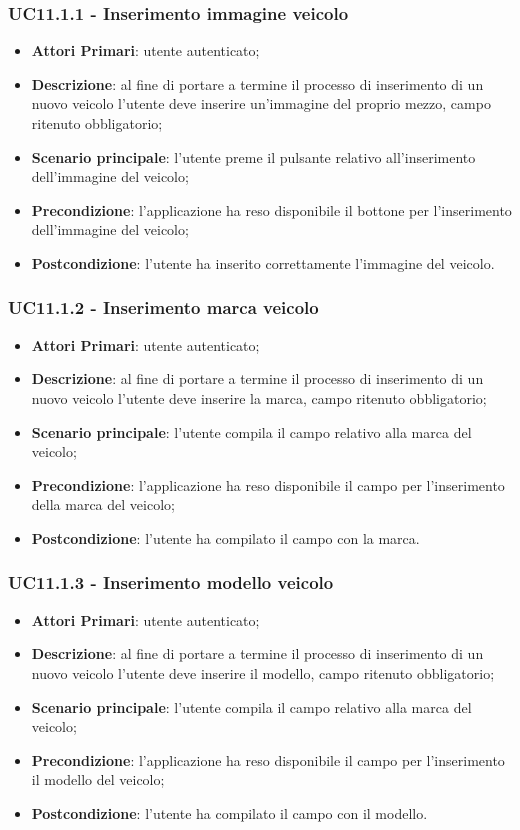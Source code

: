\subsubsection{UC11.1.1 - Inserimento immagine veicolo}
\begin{itemize}
	\item \textbf{Attori Primari}: utente autenticato;
	\item \textbf{Descrizione}: al fine di portare a termine il processo di inserimento di un nuovo veicolo l'utente deve inserire un'immagine del proprio mezzo, campo ritenuto obbligatorio; 
	\item \textbf{Scenario principale}: l'utente preme il pulsante relativo all'inserimento dell'immagine del veicolo;	
	\item \textbf{Precondizione}: l'applicazione ha reso disponibile il bottone per l'inserimento dell'immagine del veicolo;
	\item \textbf{Postcondizione}: l'utente ha inserito correttamente l'immagine del veicolo.
\end{itemize}
\subsubsection{UC11.1.2 - Inserimento marca veicolo}
\begin{itemize}
	\item \textbf{Attori Primari}: utente autenticato;
	\item \textbf{Descrizione}: al fine di portare a termine il processo di inserimento di un nuovo veicolo l'utente deve inserire la marca, campo ritenuto obbligatorio;
	\item \textbf{Scenario principale}: l'utente compila il campo relativo alla marca del veicolo;	
	\item \textbf{Precondizione}: l'applicazione ha reso disponibile il campo per l'inserimento della marca del veicolo;
	\item \textbf{Postcondizione}: l'utente ha compilato il campo con la marca.	
\end{itemize}
\subsubsection{UC11.1.3 - Inserimento modello veicolo}
\begin{itemize}
	\item \textbf{Attori Primari}: utente autenticato;
	\item \textbf{Descrizione}: al fine di portare a termine il processo di inserimento di un nuovo veicolo l'utente deve inserire il modello, campo ritenuto obbligatorio;
	\item \textbf{Scenario principale}: l'utente compila il campo relativo alla marca del veicolo;	
	\item \textbf{Precondizione}: l'applicazione ha reso disponibile il campo per l'inserimento il modello del veicolo;
	\item \textbf{Postcondizione}: l'utente ha compilato il campo con il modello.	
\end{itemize}
